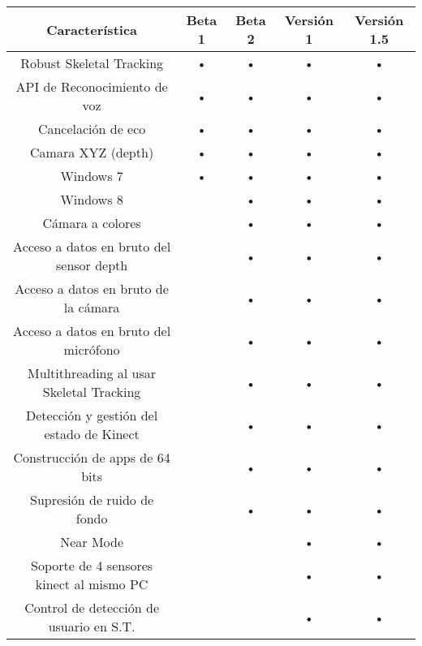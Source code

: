 \documentclass[11pt,a4paper]{article}
\begin{document}
\begin{table}[h]
	\begin{tabular}{||c||c||c||c||c||}
		\hline Característica                           & Beta 1 & Beta 2 & Versión 1 & Versión 1.5 \\ 
		\hline Robust Skeletal Tracking                 & •      & •      & •         & •           \\ 
		\hline API de Reconocimiento de voz             & •      & •      & •         & •           \\ 
		\hline Cancelación de eco                       & •      & •      & •         & •           \\ 
		\hline Camara XYZ (depth)                       & •      & •      & •         & •           \\ 
		\hline Windows 7                                & •      & •      & •         & •           \\ 
		\hline Windows 8                                &        & •      & •         & •           \\ 
		\hline Cámara a colores                         &        & •      & •         & •           \\ 
		\hline Acceso a datos en bruto del sensor depth &        & •      & •         & •           \\ 
		\hline Acceso a datos en bruto de la cámara     &        & •      & •         & •           \\ 
		\hline Acceso a datos en bruto del micrófono    &        & •      & •         & •           \\ 
		\hline Multithreading al usar Skeletal Tracking &        & •      & •         & •           \\ 
		\hline Detección y gestión del estado de Kinect &        & •      & •         & •           \\ 
		\hline Construcción de apps de 64 bits          &        & •      & •         & •           \\ 
		\hline Supresión de ruido de fondo              &        & •      & •         & •           \\ 
		\hline Near Mode                                &        &        & •         & •           \\
		\hline Soporte de 4 sensores kinect al mismo PC &        &        & •         & •           \\ 
		\hline Control de detección de usuario en S.T.  &        &        & •         & •           \\ 

\end{tabular}
\end{table}
\end{document}
